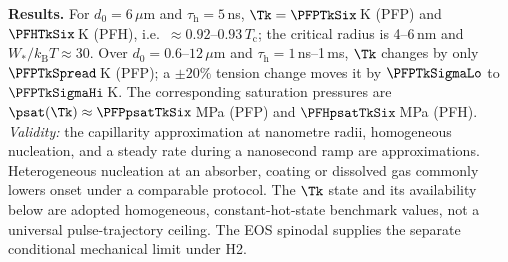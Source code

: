 \textbf{Results.} For $d_0=6\,\mu$m and $\tau_{\mathrm h}=5$\,ns, $\Tk=\PFPTkSix$\,K (PFP) and $\PFHTkSix$\,K
(PFH), i.e.\ $\approx0.92$--$0.93\,T_{\mathrm c}$; the critical radius is 4--6\,nm and $W_*/k_{\mathrm B}T\approx30$.
Over $d_0=0.6$--$12\,\mu$m and $\tau_{\mathrm h}=1$\,ns--1\,ms, $\Tk$ changes by only
$\PFPTkSpread$\,K (PFP); a $\pm20\%$ tension change moves it by $\PFPTkSigmaLo$ to $\PFPTkSigmaHi$\,K. The
corresponding saturation pressures are $\psat(\Tk)\approx\PFPpsatTkSix$\,MPa (PFP) and $\PFHpsatTkSix$\,MPa (PFH).
\emph{Validity:} the capillarity approximation at nanometre radii, homogeneous nucleation, and a steady
rate during a nanosecond ramp are approximations. Heterogeneous nucleation at an absorber, coating or
dissolved gas commonly lowers onset under a comparable protocol. The $\Tk$ state and its availability
below are adopted homogeneous, constant-hot-state benchmark values, not a universal pulse-trajectory
ceiling. The EOS spinodal supplies the separate conditional mechanical limit under H2.

